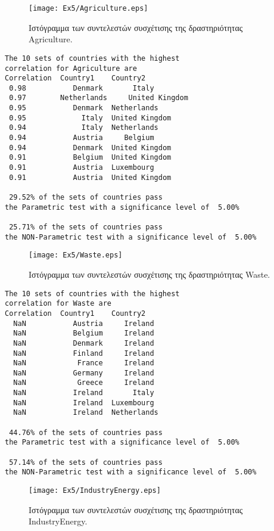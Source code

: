 \documentclass[11pt]{scrartcl} %
\begin{document}
\begin{figure}[H]
\label{fig:z51} 
	\centering
	\texttt{[image: Ex5/Agriculture.eps]}	
\caption{Ιστόγραμμα των συντελεστών συσχέτισης της δραστηριότητας Agriculture.}
\end{figure}



\begin{verbatim}
The 10 sets of countries with the highest 
correlation for Agriculture are
Correlation	 Country1	 Country2
 0.98	 	    Denmark	      Italy 
 0.97	 	 Netherlands	 United Kingdom 
 0.95	 	    Denmark	 Netherlands 
 0.95	 	      Italy	 United Kingdom 
 0.94	 	      Italy	 Netherlands 
 0.94	 	    Austria	    Belgium 
 0.94	 	    Denmark	 United Kingdom 
 0.91	 	    Belgium	 United Kingdom 
 0.91	 	    Austria	 Luxembourg 
 0.91	 	    Austria	 United Kingdom 

 29.52% of the sets of countries pass 
the Parametric test with a significance level of  5.00%

 25.71% of the sets of countries pass 
the NON-Parametric test with a significance level of  5.00%
\end{verbatim}



\begin{figure}[H]
\label{fig:z52} 
	\centering
	\texttt{[image: Ex5/Waste.eps]}	
\caption{Ιστόγραμμα των συντελεστών συσχέτισης της δραστηριότητας Waste.}
\end{figure}



\begin{verbatim}
The 10 sets of countries with the highest 
correlation for Waste are
Correlation	 Country1	 Country2
  NaN	 	    Austria	    Ireland 
  NaN	 	    Belgium	    Ireland 
  NaN	 	    Denmark	    Ireland 
  NaN	 	    Finland	    Ireland 
  NaN	 	     France	    Ireland 
  NaN	 	    Germany	    Ireland 
  NaN	 	     Greece	    Ireland 
  NaN	 	    Ireland	      Italy 
  NaN	 	    Ireland	 Luxembourg 
  NaN	 	    Ireland	 Netherlands 

 44.76% of the sets of countries pass 
the Parametric test with a significance level of  5.00%

 57.14% of the sets of countries pass 
the NON-Parametric test with a significance level of  5.00%
\end{verbatim}




\begin{figure}[H]
\label{fig:z53} 
	\centering
	\texttt{[image: Ex5/IndustryEnergy.eps]}	
\caption{Ιστόγραμμα των συντελεστών συσχέτισης της δραστηριότητας IndustryEnergy.}
\end{figure}
\end{document}
